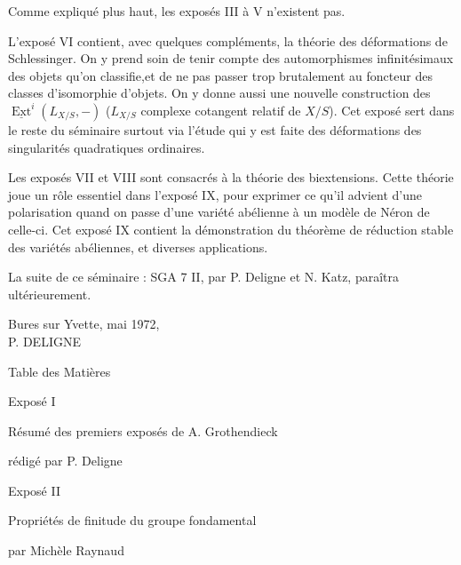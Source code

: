 Comme expliqué plus haut, les exposés III à V n'existent pas.
\clearpage

L'exposé VI contient, avec quelques compléments, la théorie des déformations
de Schlessinger. On y prend soin de tenir compte des automorphismes infinitésimaux
des objets qu'on classifie,et de ne pas passer trop brutalement au foncteur des classes
d'isomorphie d'objets. On y donne aussi une nouvelle construction des
$\underline{\operatorname{Ext}}^{i}(L_{X/S},-)$ ($L_{X/S}$ complexe cotangent relatif de $X/S$). Cet exposé sert dans le
reste du séminaire surtout via l'étude qui y est faite des déformations des singularités
quadratiques ordinaires.

Les exposés VII et VIII sont consacrés à la théorie des biextensions. Cette
théorie joue un rôle essentiel dans l'exposé IX, pour exprimer ce qu'il advient d'une
polarisation quand on passe d'une variété abélienne à un modèle de Néron de celle-ci.
Cet exposé IX contient la démonstration du théorème de réduction stable des variétés
abéliennes, et diverses applications.

La suite de ce séminaire : SGA 7 II, par P. Deligne et N. Katz, paraîtra
ultérieurement.

\begin{flushright}
Bures sur Yvette, mai 1972,\\
P. DELIGNE
\end{flushright}
\clearpage

\null
\clearpage

\begin{center}
Table des Matières
\end{center}

\noindent
Exposé I\par
\hspace*{2em}Résumé des premiers exposés de A. Grothendieck\par
\hspace*{2em}rédigé par P. Deligne \par

\medskip
\noindent
Exposé II\par
\hspace*{2em}Propriétés de finitude du groupe fondamental\par
\hspace*{2em}par Michèle Raynaud \par

